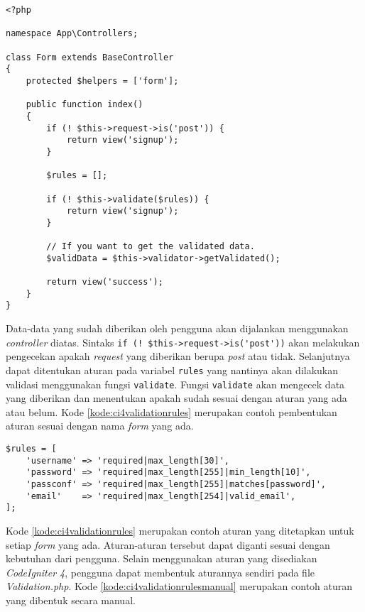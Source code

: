 \begin{lstlisting}[caption=Contoh kode untuk melakukan validasi data yang sudah dikumpulkan. ,label=kode:ci4validationcontroller]
<?php

namespace App\Controllers;

class Form extends BaseController
{
    protected $helpers = ['form'];

    public function index()
    {
        if (! $this->request->is('post')) {
            return view('signup');
        }

        $rules = [];

        if (! $this->validate($rules)) {
            return view('signup');
        }

        // If you want to get the validated data.
        $validData = $this->validator->getValidated();

        return view('success');
    }
}
\end{lstlisting}
Data-data yang sudah diberikan oleh pengguna akan dijalankan menggunakan \textit{controller} diatas. Sintaks \verb|if (! $this->request->is('post'))| akan melakukan pengecekan apakah \textit{request} yang diberikan berupa \textit{post} atau tidak. Selanjutnya dapat ditentukan aturan pada variabel \texttt{rules} yang nantinya akan dilakukan validasi menggunakan fungsi \texttt{validate}. Fungsi \texttt{validate} akan mengecek data yang diberikan dan menentukan apakah sudah sesuai dengan aturan yang ada atau belum. Kode \ref{kode:ci4validationrules} merupakan contoh pembentukan aturan sesuai dengan nama \textit{form} yang ada.

\begin{lstlisting}[caption=Contoh kode untuk menetapkan aturan untuk validasi data yang sudah dikumpulkan. ,label=kode:ci4validationrules]
$rules = [
    'username' => 'required|max_length[30]',
    'password' => 'required|max_length[255]|min_length[10]',
    'passconf' => 'required|max_length[255]|matches[password]',
    'email'    => 'required|max_length[254]|valid_email',
];
\end{lstlisting}

Kode \ref{kode:ci4validationrules} merupakan contoh aturan yang ditetapkan untuk setiap \textit{form} yang ada. Aturan-aturan tersebut dapat diganti sesuai dengan kebutuhan dari pengguna. Selain menggunakan aturan yang disediakan \textit{CodeIgniter 4}, pengguna dapat membentuk aturannya sendiri pada file \textit{Validation.php}. Kode \ref{kode:ci4validationrulesmanual} merupakan contoh aturan yang dibentuk secara manual. 


